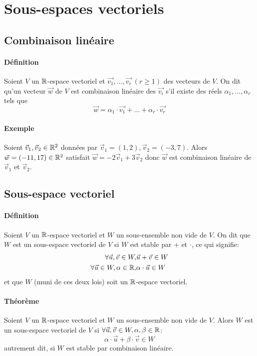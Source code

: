 %
%
\section{Sous-espaces vectoriels}
%
%

%
\subsection{Combinaison linéaire}
%
\paragraph{Définition} Soient $V$ un $\mathbb{R}$-espace vectoriel et $\vec{v_1}, \ldots, \vec{v_r} ~ (r\geq 1)$ des vecteurs de $V$. On dit qu'un vecteur $\vec{w}$ de $V$ est combinaison linéaire des $\vec{v_i}$ s'il existe des réels $\alpha_1, \ldots, \alpha_r$ tels que
$$\vec{w} = \alpha_1 \cdot \vec{v_1} + \ldots + \alpha_r \cdot \vec{v_r}$$

\paragraph{Exemple} Soient $\vec{v}_1, \vec{v}_2 \in \mathbb{R}^2$ données par $\vec{v}_1 = (1,2), \vec{v}_2 = (-3,7)$. Alors $\vec{w}=(-11,17) \in \mathbb{R}^2$ satisfait $\vec{w} = -2\vec{v}_1 + 3\vec{v}_2$ donc $\vec{w}$ est combinaison linéaire de $\vec{v}_1$ et $\vec{v}_2$.

%
\subsection{Sous-espace vectoriel}
%
\paragraph{Définition} Soient $V$ un $\mathbb{R}$-espace vectoriel et $W$ un sous-ensemble non vide de $V$. On dit que $W$ est un sous-espace vectoriel de $V$ si $W$ est stable par $+$ et $\cdot$, ce qui signifie:
\begin{eqnarray*}
  \forall \vec{u}, \vec{v} \in W, & \vec{u} + \vec{v} \in W \\
  \forall \vec{u} \in W, \alpha \in \mathbb{R}, & \alpha \cdot \vec{u} \in W \\
\end{eqnarray*}
et que $W$ (muni de ces deux lois) soit un $\mathbb{R}$-espace vectoriel.

\paragraph{Théorème} Soient $V$ un $\mathbb{R}$-espace vectoriel et $W$ un sous-ensemble non vide de $V$. Alors $W$ est un sous-espace vectoriel de $V$ si $\forall \vec{u}, \vec{v} \in W, \alpha, \beta \in \mathbb{R}$:
$$\alpha \cdot \vec{u} + \beta \cdot \vec{v} \in W$$
autrement dit, si $W$ est stable par combinaison linéaire.

